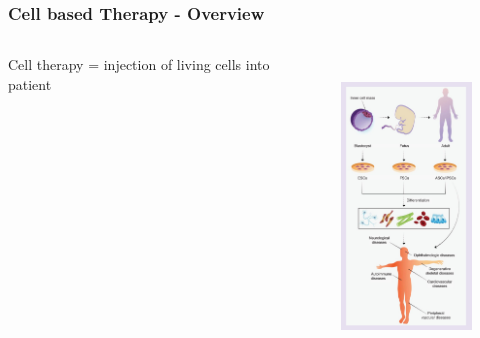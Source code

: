 \documentclass[8pt,xcolor=table]{beamer}
\begin{document}
\begin{frame}
\frametitle{Cell based Therapy - Overview}

\vspace{-1em}

\begin{columns}

\begin{column}{0.3\textwidth}

Cell therapy = injection of living cells into patient
 
 \vspace{3em}
 
 
 
\end{column}

\begin{column}{0.7\textwidth}
 \begin{figure}
  \includegraphics[height=8cm]{cell_therapy_overview}
 \end{figure}

\end{column}
\end{columns}

\end{frame}
\end{document}
